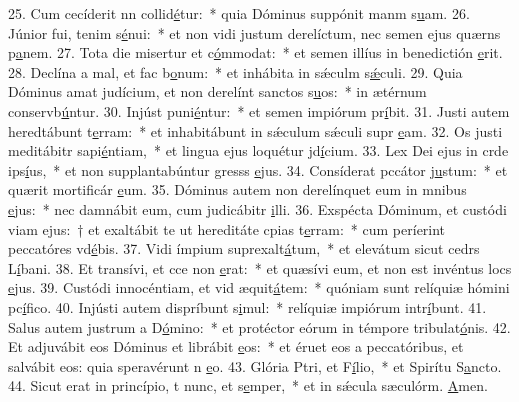 25. Cum cecíderit nn collid\uline{é}tur:~* quia Dóminus suppónit manm s\uline{u}am.
26. Júnior fui, tenim s\uline{é}nui:~* et non vidi justum derelíctum, nec semen ejus quærns p\uline{a}nem.
27. Tota die misertur et c\uline{ó}mmodat:~* et semen illíus in benedictión \uline{e}rit.
28. Declína a mal, et fac b\uline{o}num:~* et inhábita in sǽculm s\uline{ǽ}culi.
29. Quia Dóminus amat judícium, et non derelínt sanctos s\uline{u}os:~* in ætérnum conservb\uline{ú}ntur.
30. Injúst puni\uline{é}ntur:~* et semen impiórum pr\uline{í}bit.
31. Justi autem heredtábunt t\uline{e}rram:~* et inhabitábunt in sǽculum sǽculi supr \uline{e}am.
32. Os justi meditábitr sapi\uline{é}ntiam,~* et lingua ejus loquétur jd\uline{í}cium.
33. Lex Dei ejus in crde ips\uline{í}us,~* et non supplantabúntur gresss \uline{e}jus.
34. Consíderat pccátor j\uline{u}stum:~* et quærit mortificár \uline{e}um.
35. Dóminus autem non derelínquet eum in mnibus \uline{e}jus:~* nec damnábit eum, cum judicábitr \uline{i}lli.
36. Exspécta Dóminum, et custódi viam ejus:~† et exaltábit te ut hereditáte cpias t\uline{e}rram:~* cum períerint peccatóres vd\uline{é}bis.
37. Vidi ímpium suprexalt\uline{á}tum,~* et elevátum sicut cedrs L\uline{í}bani.
38. Et transívi, et cce non \uline{e}rat:~* et quæsívi eum, et non est invéntus locs \uline{e}jus.
39. Custódi innocéntiam, et vid æquit\uline{á}tem:~* quóniam sunt relíquiæ hómini pc\uline{í}fico.
40. Injústi autem dispríbunt s\uline{i}mul:~* relíquiæ impiórum intr\uline{í}bunt.
41. Salus autem justrum a D\uline{ó}mino:~* et protéctor eórum in témpore tribulat\uline{ó}nis.
42. Et adjuvábit eos Dóminus et librábit \uline{e}os:~* et éruet eos a peccatóribus, et salvábit eos: quia speravérunt n \uline{e}o.
43. Glória Ptri, et F\uline{í}lio,~* et Spirítu S\uline{a}ncto.
44. Sicut erat in princípio, t nunc, et s\uline{e}mper,~* et in sǽcula sæculórm. \uline{A}men.
